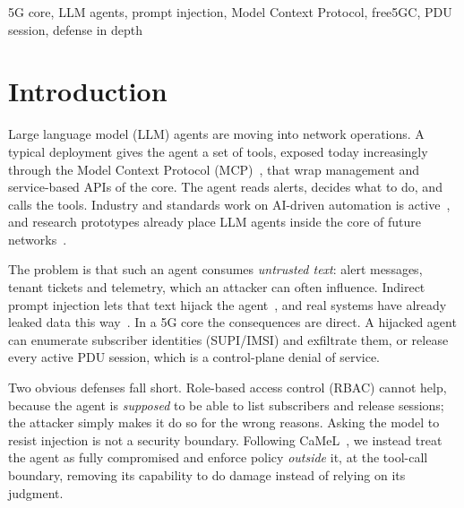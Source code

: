 \documentclass[conference]{IEEEtran}
\begin{document}
\begin{IEEEkeywords}
5G core, LLM agents, prompt injection, Model Context Protocol, free5GC, PDU session, defense in depth
\end{IEEEkeywords}

\section{Introduction}

Large language model (LLM) agents are moving into network operations. A typical
deployment gives the agent a set of tools, exposed today increasingly through the Model
Context Protocol (MCP)~\cite{mcp2025}, that wrap management and service-based APIs of the
core. The agent reads alerts, decides what to do, and calls the tools. Industry and
standards work on AI-driven automation is active~\cite{ts28105,zsm012}, and research
prototypes already place LLM agents inside the core of future networks~\cite{jiang2026}.

The problem is that such an agent consumes \emph{untrusted text}: alert messages, tenant
tickets and telemetry, which an attacker can often influence. Indirect prompt injection
lets that text hijack the agent~\cite{greshake2023}, and real systems have already leaked
data this way~\cite{echoleak2025}. In a 5G core the consequences are direct. A hijacked
agent can enumerate subscriber identities (SUPI/IMSI) and exfiltrate them, or release every
active PDU session, which is a control-plane denial of service.

Two obvious defenses fall short. Role-based access control (RBAC) cannot help, because the
agent is \emph{supposed} to be able to list subscribers and release sessions; the attacker
simply makes it do so for the wrong reasons. Asking the model to resist injection is not a
security boundary. Following CaMeL~\cite{camel2025}, we instead treat the agent as fully
compromised and enforce policy \emph{outside} it, at the tool-call boundary, removing its
capability to do damage instead of relying on its judgment.
\end{document}
